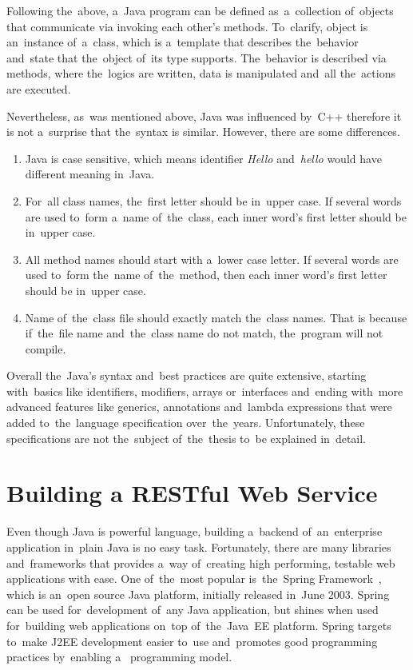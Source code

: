 Following the~above, a~Java program can be defined as~a~collection of~objects
that communicate via invoking each other's methods. To~clarify, object is
an~instance of~a~class, which is a~template that describes the~behavior
and~state that the~object of~its type supports. The~behavior is described via
methods, where the~logics are written, data is manipulated and~all the~actions
are executed.

Nevertheless, as~was mentioned above, Java was influenced by~C++ therefore it is
not a~surprise that the~syntax is similar. However, there are some differences.

\begin{enumerate}
  \item Java is case sensitive, which means identifier \textit{Hello}
  and~\textit{hello} would have different meaning in~Java.
  \item For~all class names, the~first letter should be in~upper case. If
  several words are used to~form a~name of~the~class, each inner word's first
  letter should be in~upper case.
  \item All method names should start with a~lower case letter. If several words
  are used to~form the~name of~the~method, then each inner word's first letter
  should be in~upper case.
  \item Name of~the~class file should exactly match the~class names. That is
  because if~the~file name and~the~class name do not match, the~program will not
  compile.
\end{enumerate}

Overall the~Java's syntax and~best practices are quite extensive, starting
with~basics like identifiers, modifiers, arrays or~interfaces and~ending
with~more advanced features like generics, annotations and~lambda expressions
that were added to~the~language specification over~the~years. Unfortunately,
these specifications are not the~subject of~the~thesis to~be explained
in~detail.



\section{Building a RESTful Web Service}
Even though Java is powerful language, building a~backend of~an~enterprise
application in~plain Java is no easy task. Fortunately, there are many libraries
and~frameworks that provides a~way of~creating high performing, testable web
applications with ease. One of~the~most popular is~the~Spring
Framework~\cite{Spring}, which is an~open source Java platform, initially
released in~June 2003. Spring can be used for~development of~any Java
application, but shines when used for~building web applications on~top
of~the~Java~EE platform. Spring targets to~make J2EE development easier to~use
and~promotes good programming practices by~enabling
a~ programming model.



